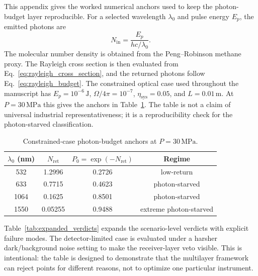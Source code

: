 \documentclass[a4paper,11pt]{article}
\numberwithin{equation}{section}
\newcommand{\Nret}{N_{\mathrm{ret}}}
\begin{document}
This appendix gives the worked numerical anchors used to keep the photon-budget layer reproducible. For a selected wavelength $\lambda_0$ and pulse energy $E_p$, the emitted photons are
\begin{equation}
  N_{\mathrm{in}}=\frac{E_p}{hc/\lambda_0}.
\end{equation}
The molecular number density is obtained from the Peng--Robinson methane proxy. The Rayleigh cross section is then evaluated from Eq.~\eqref{eq:rayleigh_cross_section}, and the returned photons follow Eq.~\eqref{eq:rayleigh_budget}. The constrained optical case used throughout the manuscript has $E_p=10^{-6}\,\mathrm{J}$, $\Omega/4\pi=10^{-7}$, $\eta_{\mathrm{sys}}=0.05$, and $L=0.01\,\mathrm{m}$. At $P=30\,\mathrm{MPa}$ this gives the anchors in Table~\ref{tab:worked_anchor}. The table is not a claim of universal industrial representativeness; it is a reproducibility check for the photon-starved classification.

\begin{table}[htbp]
\centering
\caption{Constrained-case photon-budget anchors at $P=30\,\mathrm{MPa}$.}
\label{tab:worked_anchor}
\begin{tabular}{cccc}
\toprule
$\lambda_0$ (nm) & $\Nret$ & $P_0=\exp(-\Nret)$ & Regime \\
\midrule
532 & 1.2996 & 0.2726 & low-return \\
633 & 0.7715 & 0.4623 & photon-starved \\
1064 & 0.1625 & 0.8501 & photon-starved \\
1550 & 0.05255 & 0.9488 & extreme photon-starved \\
\bottomrule
\end{tabular}
\end{table}

Table~\ref{tab:expanded_verdicts} expands the scenario-level verdicts with explicit failure modes. The detector-limited case is evaluated under a harsher dark/background noise setting to make the receiver-layer veto visible. This is intentional: the table is designed to demonstrate that the multilayer framework can reject points for different reasons, not to optimize one particular instrument.
\end{document}
